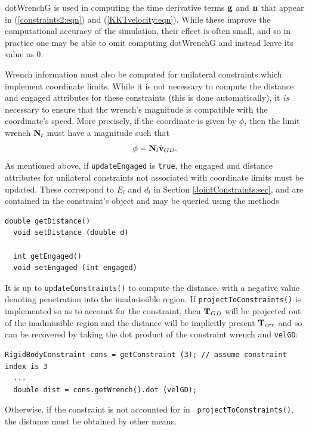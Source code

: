 \begin{sideblock}
{\sf dotWrenchG} is used in computing the time derivative terms ${\bf g}$
and ${\bf n}$ that appear in (\ref{constraints2:eqn}) and
(\ref{KKTvelocity:eqn}). While these improve the computational
accuracy of the simulation, their effect is often small, and so in
practice one may be able to omit computing {\sf dotWrenchG} and
instead leave its value as 0.
\end{sideblock}

Wrench information must also be computed for unilateral constraints
which implement coordinate limits. While it is not necessary to
compute the {\sf distance} and {\sf engaged} attributes for these
constraints (this is done automatically), it {\it is} necessary to
ensure that the wrench's magnitude is compatible with the coordinate's
speed. More precisely, if the coordinate is given by $\phi$, then the
limit wrench ${\bf N}_l$ must have a magnitude such that
%
\begin{equation}
\dot\phi = {\bf N}_l \hat{{\bf v}}_{GD}.
\end{equation}
%
As mentioned above, if {\tt updateEngaged} is {\tt true}, the {\sf
engaged} and {\sf distance} attributes for unilateral constraints not
associated with coordinate limits must be updated.  These correspond
to $E_l$ and $d_l$ in Section \ref{JointConstraints:sec}, and are
contained in the constraint's
 object and may
be queried using the methods
\begin{lstlisting}[]
  double getDistance()
  void setDistance (double d)

  int getEngaged()
  void setEngaged (int engaged)
\end{lstlisting}
%
It is up to {\tt updateConstraints()} to compute the distance, with
a negative value denoting penetration into the inadmissible
region. If {\tt projectToConstraints()} is
implemented so as to account for the constraint, then ${\bf T}_{GD}$ will
be projected out of the inadmissible region and the distance will be
implicitly present ${\bf T}_{err}$ and so can be recovered by taking
the dot product of the constraint wrench and {\tt velGD}:
%
\begin{lstlisting}[]
  RigidBodyConstraint cons = getConstraint (3); // assume constraint index is 3
  ...
  double dist = cons.getWrench().dot (velGD);
\end{lstlisting}
%
Otherwise, if the constraint is not accounted for in {\tt
projectToConstraints()}, the distance must be obtained by other means.

